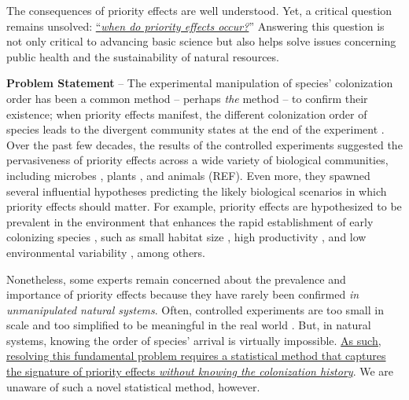 \documentclass[12pt, class=article, crop=false]{standalone}
\begin{document}
The consequences of priority effects are well understood.
Yet, a critical question remains unsolved: \ul{``\textit{when do priority effects occur?}}'' 
Answering this question is not only critical to advancing basic science but also helps solve issues concerning public health and the sustainability of natural resources.

\textbf{Problem Statement} --
The experimental manipulation of species' colonization order has been a common method -- perhaps \textit{the} method -- to confirm their existence; when priority effects manifest, the different colonization order of species leads to the divergent community states at the end of the experiment \citep{fukami_historical_2015, weidlich_priority_2021}.
Over the past few decades, the results of the controlled experiments suggested the pervasiveness of priority effects across a wide variety of biological communities, including microbes \citep{fukami_historical_2015}, plants \citep{weidlich_priority_2021}, and animals (REF).
Even more, they spawned several influential hypotheses predicting the likely biological scenarios in which priority effects should matter.
For example, priority effects are hypothesized to be prevalent in the environment that enhances the rapid establishment of early colonizing species \citep{fukami_historical_2015}, such as small habitat size \citep{fukami_assembly_2004}, high productivity \citep{chase_stochastic_2010}, and low environmental variability \citep{tucker_environmental_2014}, among others.

Nonetheless, some experts remain concerned about the prevalence and importance of priority effects because they have rarely been confirmed \textit{in unmanipulated natural systems}.
Often, controlled experiments are too small in scale and too simplified to be meaningful in the real world \citep{weidlich_priority_2021}.
But, in natural systems, knowing the order of species' arrival is virtually impossible.
\ul{As such, resolving this fundamental problem requires a statistical method that captures the signature of priority effects \textit{without knowing the colonization history}}.
We are unaware of such a novel statistical method, however. 
\end{document}
